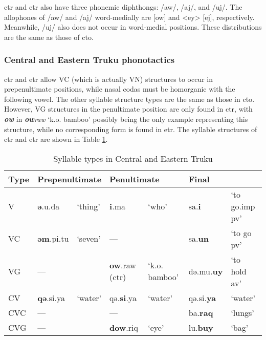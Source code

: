 \acl{ctr} and \acl{etr} also have three phonemic diphthongs: /aw/, /aj/, and /uj/. The allophones of /aw/ and /aj/ word-medially are [ow] and <ey> [ej], respectively. Meanwhile, /uj/ also does not occur in word-medial positions. These distributions are the same as those of \acl{cto}.

\subsubsection{Central and Eastern Truku phonotactics}

\acl{ctr} and \acl{etr} allow VC (which is actually VN) structures to occur in prepenultimate positions, while nasal codas must be homorganic with the following vowel. The other syllable structure types are the same as those in \acl{cto}. However, VG structures in the penultimate position are only found in \acl{ctr}, with \textbf{\textit{ow}} in \textit{\textbf{ow}raw} `k.o. bamboo' possibly being the only example representing this structure, while no corresponding form is found in \acl{etr}. The syllable structures of \acl{ctr} and \acl{etr} are shown in Table \ref{tab:sy_ty_tr}.

\begin{table}[!htbp]
\centering
\caption{Syllable types in Central and Eastern Truku}
\label{tab:sy_ty_tr}
\begin{tabular}{lllllll}
\hline
Type & \multicolumn{2}{l}{Prepenultimate} & \multicolumn{2}{l}{Penultimate} & \multicolumn{2}{l}{Final}                \\ \hline
V             & \textbf{ə}.u.da   & `thing'         & \textbf{i}.ma              & `who'         & sa.\textbf{i}        & `to go.\acs{imp} \acs{pv}' \\
VC            & \textbf{əm}.pi.tu & `seven'        & ---                         &               & sa.\textbf{un}       & `to go \acs{pv}'           \\
VG            & ---              &                 & \textbf{ow}.raw (\acs{ctr})   & `k.o. bamboo' & də.mu.\textbf{uy} &  `to hold \acs{av}'        \\
CV            & \textbf{qə}.si.ya  & `water'       & qə.\textbf{si}.ya          & `water'       & qə.si.\textbf{ya}    & `water'                    \\
CVC           & ---              &                 & ---                        &               & ba.\textbf{raq}      & `lungs'                    \\
CVG           & ---              &                 & \textbf{dow}.riq           & `eye'    & lu.\textbf{buy}      & `bag'                     \\ \hline
\end{tabular}
\end{table}

